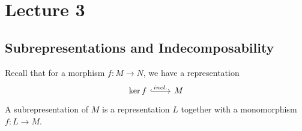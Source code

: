 \documentclass[11pt, a4paper]{report}
\begin{document}
\chapter{Lecture 3}

\section{Subrepresentations and Indecomposability}

\begin{definition}
    Recall that for a morphism $f: M \to N$, we have a representation
    \[
        \begin{tikzcd}
            \operatorname{ker} f \arrow[r, "incl.", hook] & M
        \end{tikzcd}
    \]
    A subrepresentation of $M$ is a representation $L$ together with a monomorphism $f: L \to M$.
\end{definition}
\end{document}

